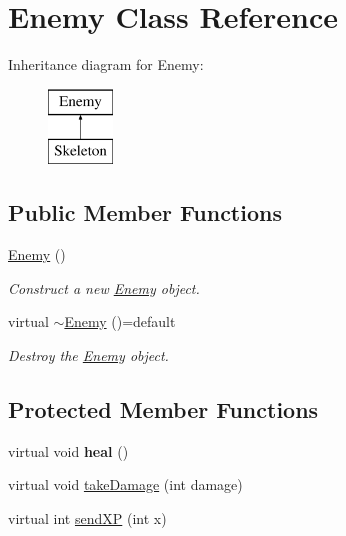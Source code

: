 \hypertarget{classEnemy}{}\section{Enemy Class Reference}
\label{classEnemy}
Inheritance diagram for Enemy\+:\begin{figure}[H]
\begin{center}
\leavevmode
\includegraphics[height=2.000000cm]{classEnemy}
\end{center}
\end{figure}
\subsection*{Public Member Functions}
\begin{DoxyCompactItemize}
\item 
\mbox{\hyperlink{classEnemy_a94f30d348b6d2840fd71675472ba38dd}{Enemy}} ()
\begin{DoxyCompactList}\small\item\em Construct a new \mbox{\hyperlink{classEnemy}{Enemy}} object. \end{DoxyCompactList}\item 
virtual \mbox{\hyperlink{classEnemy_aafb628c66008e33afdd750e2f492bd98}{$\sim$\+Enemy}} ()=default
\begin{DoxyCompactList}\small\item\em Destroy the \mbox{\hyperlink{classEnemy}{Enemy}} object. \end{DoxyCompactList}\end{DoxyCompactItemize}
\subsection*{Protected Member Functions}
\begin{DoxyCompactItemize}
\item 
\mbox{\label{classEnemy_a5f7ddbe448758f4a8eef7d846903ce99}} 
virtual void {\bfseries heal} ()
\item 
virtual void \mbox{\hyperlink{classEnemy_ae01c62a474fbcd547000ff1068976d49}{take\+Damage}} (int damage)
\item 
virtual int \mbox{\hyperlink{classEnemy_a755e7d44eb291517f28e9cad2c6c7111}{send\+XP}} (int x)
\end{DoxyCompactItemize}
